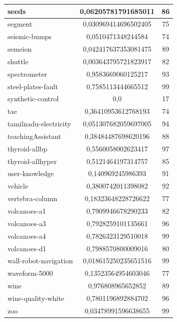 \documentclass[times,specification,annotation]{itmo-student-thesis}
\begin{document}
\begin{center}
\begin{longtable}{ |m{5cm}|c|c| }
		\hline
		seeds & 0,06205781791685011 & 86 \\
		\hline
		segment & 0,030969414696502405 & 75 \\
		\hline
		seismic-bumps & 0,0510471348244584 & 74 \\
		\hline
		semeion & 0,042417637353081475 & 89 \\
		\hline
		shuttle & 0,003643795721823917 & 82 \\
		\hline
		spectrometer & 0,9583669060125217 & 93 \\
		\hline
		steel-plates-fault & 0,7585113444665512 & 99 \\
		\hline
		synthetic-control & 0,0 & 17 \\
		\hline
		tae & 0,36410953612768193 & 74 \\
		\hline
		tamilnadu-electricity & 0,051307682059697005 & 94 \\
		\hline
		teachingAssistant & 0,38484487698620196 & 88 \\
		\hline
		thyroid-allbp & 0,5560058002623417 & 97 \\
		\hline
		thyroid-allhyper & 0,5121464197314757 & 85 \\
		\hline
		user-knowledge & 0,140969245986393 & 91 \\
		\hline
		vehicle & 0,3800742011398082 & 92 \\
		\hline
		vertebra-column & 0,18323648228726622 & 77 \\
		\hline
		volcanoes-a1 & 0,7909946678290233 & 82 \\
		\hline
		volcanoes-a3 & 0,7928259101135661 & 96 \\
		\hline
		volcanoes-a4 & 0,7826323129510018 & 99 \\
		\hline
		volcanoes-d1 & 0,7988570800009016 & 80 \\
		\hline
		wall-robot-navigation & 0,018615250235651516 & 99 \\
		\hline
		waveform-5000 & 0,13523564954603046 & 77 \\
		\hline
		wine & 0,976808965652852 & 89 \\
		\hline
		wine-quality-white & 0,7801196892884702 & 96 \\
		\hline
		zoo & 0,03478991596638655 & 99 \\
		\hline
	\end{longtable}
\end{center}
\end{document}
